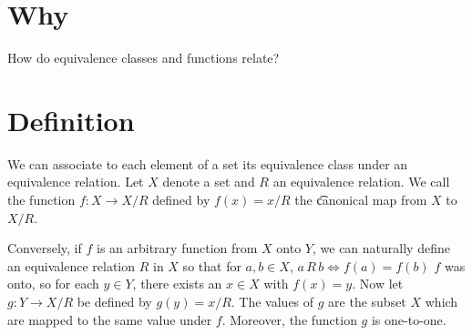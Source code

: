 
\section*{Why}

How do equivalence classes and functions relate?

\section*{Definition}

We can associate to each element of a set its equivalence class under an equivalence relation.
Let $X$ denote a set and $R$ an equivalence relation.
We call the function $f: X \to X/R$ defined by $f(x) = x/R$ the \t{canonical map} from $X$ to $X/R$.

Conversely, if $f$ is an arbitrary function from $X$ onto $Y$, we can naturally define an equivalence relation $R$ in $X$ so that for $a, b \in X$, $a\,R\,b \iff f(a) = f(b)$
$f$ was onto, so for each $y \in Y$, there exists an $x \in X$ with $f(x) = y$.
Now let $g: Y \to X/R$ be defined by $g(y) = x/R$.
The values of $g$ are the subset $X$ which are mapped to the same value under $f$.
Moreover, the function $g$ is one-to-one.

\blankpage